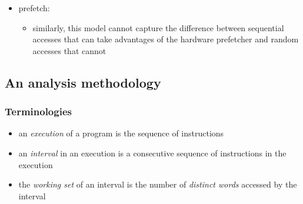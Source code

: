 \documentclass[12pt,dvipdfmx]{beamer}
\newcommand{\ao}[1]{{\color{blue}#1}}
\begin{document}
\begin{frame}
\begin{itemize}
\item<3-> \ao{prefetch:}
  \begin{itemize}
  \item similarly, this model 
    cannot capture the difference
    between sequential accesses that can take advantages of
    the hardware prefetcher and random accesses that cannot
  \end{itemize}
\end{itemize}
\end{frame}


\subsection{An analysis methodology}


\begin{frame}
\frametitle{Terminologies}

\begin{itemize}
\item<1-> an \ao{\emph{execution}} of a program is the sequence of
  instructions 
\item<3-> an \ao{\emph{interval}} in an execution is a consecutive
  sequence of instructions in the execution
\item<4-> the \ao{\emph{working set}} of an interval is the
  number of \ao{\emph{distinct words}} accessed by the interval
\end{itemize}

\begin{center}
%
%
%
%
\end{center}
\end{frame}
\end{document}
